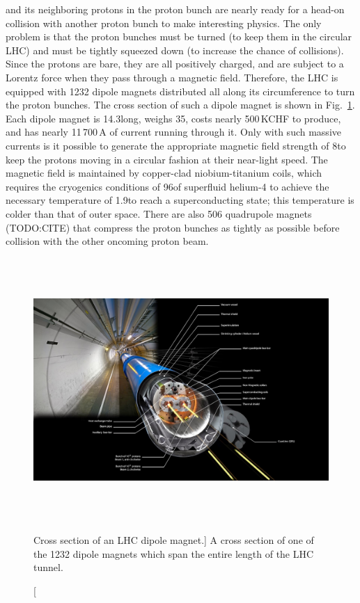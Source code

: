 \pname and its neighboring protons in the proton bunch are nearly ready for a head-on collision with another proton bunch to make interesting physics.
The only problem is that the proton bunches must be turned (to keep them in the circular LHC) and must be tightly squeezed down (to increase the chance of \pp collisions).
Since the protons are bare, they are all positively charged, and are subject to a Lorentz force when they pass through a magnetic field.
Therefore, the LHC is equipped with 1232 dipole magnets distributed all along its circumference to turn the proton bunches.
The cross section of such a dipole magnet is shown in Fig.~\ref{fig:lhc_dipole_xs}.
Each dipole magnet is 14.3\meter long, weighs 35\tonne, costs nearly 500\,KCHF to produce, and has nearly 11\,700\,A of current running through it.  %
Only with such massive currents is it possible to generate the appropriate magnetic field strength of 8\tesla to keep the protons moving in a circular fashion at their near-light speed. 
The magnetic field is maintained by copper-clad niobium-titanium coils, which requires the cryogenics conditions of 96\tonne of superfluid helium-4 to achieve the necessary temperature of 1.9\kelvin to reach a superconducting state; 
this temperature is colder than that of outer space.
There are also 506 quadrupole magnets (TODO:CITE) that compress the proton bunches as tightly as possible before collision with the other oncoming proton beam.
\begin{figure}[pbth]
\centering
\includegraphics[width=15cm,height=10cm,keepaspectratio]{figures/lhc/lhc_dipole_xs.jpg}
    \caption
        [Cross section of an LHC dipole magnet.]
        {A cross section of one of the 1232 dipole magnets which span the entire length of the LHC tunnel.} 
    \label{fig:lhc_dipole_xs}
\end{figure}

